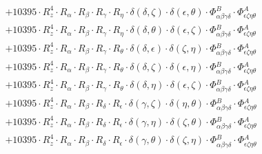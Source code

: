 \documentclass{article}
\begin{document}
\begin{equation}
\begin{array}{c}
 \\[0.2em] 		 + 10395 \cdot R_{z}^{4} \cdot R_{\alpha{}} \cdot R_{\beta{}} \cdot R_{\gamma{}} \cdot R_{\eta{}} \cdot \delta{}\left(\delta{}, \zeta{}\right) \cdot \delta{}\left(\epsilon{}, \theta{}\right) \cdot \Phi{}^{B}_{\alpha{}\beta{}\gamma{}\delta{}} \cdot \Phi{}^{A}_{\epsilon{}\zeta{}\eta{}\theta{}} 
 \\[0.2em] 		 + 10395 \cdot R_{z}^{4} \cdot R_{\alpha{}} \cdot R_{\beta{}} \cdot R_{\gamma{}} \cdot R_{\eta{}} \cdot \delta{}\left(\delta{}, \theta{}\right) \cdot \delta{}\left(\epsilon{}, \zeta{}\right) \cdot \Phi{}^{B}_{\alpha{}\beta{}\gamma{}\delta{}} \cdot \Phi{}^{A}_{\epsilon{}\zeta{}\eta{}\theta{}} 
 \\[0.2em] 		 + 10395 \cdot R_{z}^{4} \cdot R_{\alpha{}} \cdot R_{\beta{}} \cdot R_{\gamma{}} \cdot R_{\theta{}} \cdot \delta{}\left(\delta{}, \epsilon{}\right) \cdot \delta{}\left(\zeta{}, \eta{}\right) \cdot \Phi{}^{B}_{\alpha{}\beta{}\gamma{}\delta{}} \cdot \Phi{}^{A}_{\epsilon{}\zeta{}\eta{}\theta{}} 
 \\[0.2em] 		 + 10395 \cdot R_{z}^{4} \cdot R_{\alpha{}} \cdot R_{\beta{}} \cdot R_{\gamma{}} \cdot R_{\theta{}} \cdot \delta{}\left(\delta{}, \zeta{}\right) \cdot \delta{}\left(\epsilon{}, \eta{}\right) \cdot \Phi{}^{B}_{\alpha{}\beta{}\gamma{}\delta{}} \cdot \Phi{}^{A}_{\epsilon{}\zeta{}\eta{}\theta{}} 
 \\[0.2em] 		 + 10395 \cdot R_{z}^{4} \cdot R_{\alpha{}} \cdot R_{\beta{}} \cdot R_{\gamma{}} \cdot R_{\theta{}} \cdot \delta{}\left(\delta{}, \eta{}\right) \cdot \delta{}\left(\epsilon{}, \zeta{}\right) \cdot \Phi{}^{B}_{\alpha{}\beta{}\gamma{}\delta{}} \cdot \Phi{}^{A}_{\epsilon{}\zeta{}\eta{}\theta{}} 
 \\[0.2em] 		 + 10395 \cdot R_{z}^{4} \cdot R_{\alpha{}} \cdot R_{\beta{}} \cdot R_{\delta{}} \cdot R_{\epsilon{}} \cdot \delta{}\left(\gamma{}, \zeta{}\right) \cdot \delta{}\left(\eta{}, \theta{}\right) \cdot \Phi{}^{B}_{\alpha{}\beta{}\gamma{}\delta{}} \cdot \Phi{}^{A}_{\epsilon{}\zeta{}\eta{}\theta{}} 
 \\[0.2em] 		 + 10395 \cdot R_{z}^{4} \cdot R_{\alpha{}} \cdot R_{\beta{}} \cdot R_{\delta{}} \cdot R_{\epsilon{}} \cdot \delta{}\left(\gamma{}, \eta{}\right) \cdot \delta{}\left(\zeta{}, \theta{}\right) \cdot \Phi{}^{B}_{\alpha{}\beta{}\gamma{}\delta{}} \cdot \Phi{}^{A}_{\epsilon{}\zeta{}\eta{}\theta{}} 
 \\[0.2em] 		 + 10395 \cdot R_{z}^{4} \cdot R_{\alpha{}} \cdot R_{\beta{}} \cdot R_{\delta{}} \cdot R_{\epsilon{}} \cdot \delta{}\left(\gamma{}, \theta{}\right) \cdot \delta{}\left(\zeta{}, \eta{}\right) \cdot \Phi{}^{B}_{\alpha{}\beta{}\gamma{}\delta{}} \cdot \Phi{}^{A}_{\epsilon{}\zeta{}\eta{}\theta{}} 

\end{array}
\end{equation}
\end{document}
